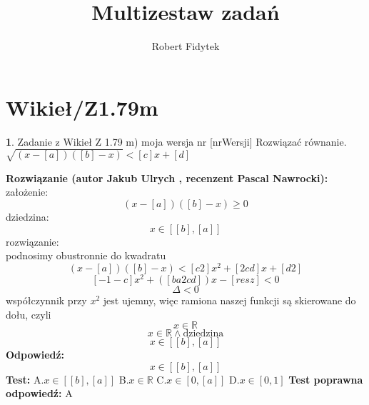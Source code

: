 \documentclass[12pt, a4paper]{article}
\title{Multizestaw zadań}
\author{Robert Fidytek}
\date{}
\theoremstyle{definition} %
\newtheorem{zad}{}
\newcommand{\kategoria}[1]{\section{#1}} %
\newcommand{\zadStart}[1]{\begin{zad}#1\newline} %
\newcommand{\zadStop}{\end{zad}}   %
\newcommand{\rozwStart}[2]{\noindent \textbf{Rozwiązanie (autor #1 , recenzent #2): }\newline} %
\newcommand{\rozwStop}{\newline}                                            %
\newcommand{\odpStart}{\noindent \textbf{Odpowiedź:}\newline}    %
\newcommand{\odpStop}{\newline}                                             %
\newcommand{\testStart}{\noindent \textbf{Test:}\newline} %
\newcommand{\testStop}{\newline} %
\newcommand{\kluczStart}{\noindent \textbf{Test poprawna odpowiedź:}\newline} %
\newcommand{\kluczStop}{\newline} %
\begin{document}
\maketitle


\kategoria{Wikieł/Z1.79m}
\zadStart{Zadanie z Wikieł Z 1.79 m) moja wersja nr [nrWersji]}
Rozwiązać równanie. $\sqrt{(x-[a])([b]-x)}<[c]x+[d]$
\zadStop
\rozwStart{Jakub Ulrych}{Pascal Nawrocki}
założenie: $$(x-[a])([b]-x)\geq0$$
dziedzina:
$$x\in[[b],[a]]$$
rozwiązanie:\\podnosimy obustronnie do kwadratu
$$(x-[a])([b]-x)<[c2]x^{2}+[2cd]x+[d2]$$
$$[-1-c]x^{2}+([ba2cd])x-[resz]<0$$
$$\Delta<0$$
współczynnik przy $x^{2}$ jest ujemny, więc ramiona naszej funkcji są skierowane do dołu, czyli
$$x\in\mathbb{R}$$
$$x\in\mathbb{R} \land \text{dziedzina}$$
$$x\in[[b],[a]]$$
\rozwStop
\odpStart
$$x\in[[b],[a]]$$
\odpStop
\testStart
A.$x\in[[b],[a]]$
B.$x\in\mathbb{R}$
C.$x\in[0,[a]]$
D.$x\in[0,1]$
\testStop
\kluczStart
A
\kluczStop
\end{document}
